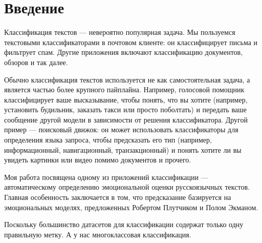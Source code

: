 \chapter*{Введение}
\thispagestyle{fancy}

\par
Классификация текстов --- невероятно популярная задача. Мы пользуемся текстовыми классификаторами в почтовом клиенте: он классифицирует письма и фильтрует спам. Другие приложения включают классификацию документов, обзоров и так далее.

\bigskip\par
Обычно классификация текстов используется не как самостоятельная задача, а является частью более крупного пайплайна. Например, голосовой помощник классифицирует ваше высказывание, чтобы понять, что вы хотите (например, установить будильник, заказать такси или просто поболтать) и передать ваше сообщение другой модели в зависимости от решения классификатора.  Другой пример --- поисковый движок: он может использовать классификаторы для определения языка запроса, чтобы предсказать его тип (например, информационный, навигационный, транзакционный) и понять хотите ли вы увидеть картинки или видео помимо документов и прочего.

\bigskip\par
Моя работа посвящена одному из приложений классификации --- автоматическому определению эмоциональной оценки русскоязычных текстов. Главная особенность  заключается в том, что предсказание базируется на эмоциональных моделях, предложенных Робертом Плутчиком и Полом Экманом.


\bigskip\par
Поскольку большинство датасетов для классификации содержат только одну правильную метку. А у нас многоклассовая классификация.
